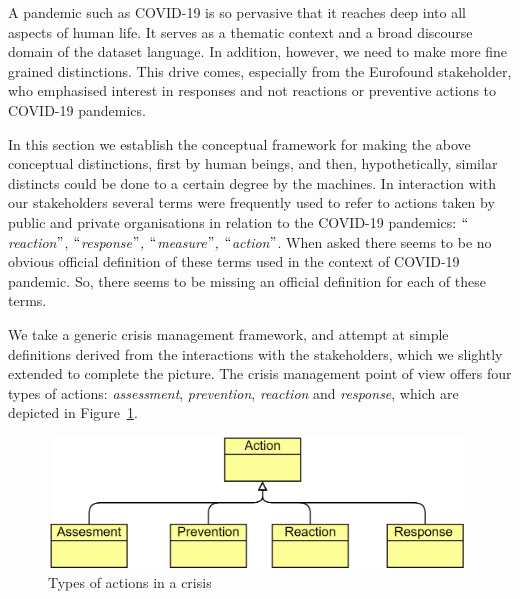 A pandemic such as COVID-19 is so pervasive that it reaches deep into all aspects of human life. It serves as a thematic context and a broad discourse domain of the dataset language. In addition, however, we need to make more fine grained distinctions. This drive comes, especially from the Eurofound stakeholder, who emphasised interest in responses and not reactions or preventive actions to COVID-19 pandemics. 

In this section we establish the conceptual framework for making the above conceptual distinctions, first by human beings, and then, hypothetically, similar distincts could be done to a certain degree by the machines. 
In interaction with our stakeholders several terms were frequently used to refer to actions taken by public and private organisations in relation to the COVID-19 pandemics: \textit{$``$reaction$"$}, \textit{$``$response$"$, $``$measure$"$, $``$action$"$}. When asked there seems to be no obvious official definition of these terms used in the context of COVID-19 pandemic. So, there seems to be missing an official definition for each of these terms. 

We take a generic crisis management framework, and attempt at simple definitions derived from the interactions with the stakeholders, which we slightly extended to complete the picture. The crisis management point of view offers four types of actions: \textit{assessment}, \textit{prevention}, \textit{reaction} and \textit{response}, which are depicted in \mbox{Figure \ref{fig:Types_of_actions_in_a_crisis}. }

\begin{Center}
\begin{figure}[H]
	\begin{Center}
		\includegraphics[width=4.36in,height=1.37in]{images/image6.png}
		\caption{Types of actions in a crisis}
		\label{fig:Types_of_actions_in_a_crisis}
	\end{Center}
\end{figure}
\end{Center}

